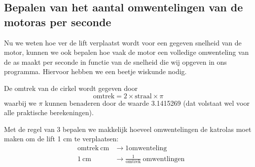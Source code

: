\documentclass[a4paper, 10pt]{article}
\begin{document}
\subsection{Bepalen van het aantal omwentelingen van de motoras per seconde}

Nu we weten hoe ver de lift verplaatst wordt voor een gegeven snelheid van de motor, kunnen we ook bepalen
hoe vaak de motor een volledige omwenteling van de as maakt per seconde in functie van de snelheid die wij
opgeven in ons programma. Hiervoor hebben we een beetje wiskunde nodig.

De omtrek van de cirkel wordt gegeven door
\begin{equation}
\mathrm{omtrek} = 2 \times \mathrm{straal} \times \pi
\end{equation}
waarbij we $\pi$ kunnen benaderen door de waarde 3.1415269 (dat volstaat wel voor alle praktische berekeningen).

Met de regel van 3 bepalen we makkelijk hoeveel omwentelingen de katrolas moet maken om de lift 1 cm te verplaatsen:
\begin{align}
& \mathrm{omtrek}\ \mathrm{cm} & \rightarrow 1 \mathrm{omwenteling}\\
& 1\ \mathrm{cm}               & \rightarrow \frac{1}{\mathrm{omtrek}}\ \mathrm{omwentlingen}
\end{align}
\end{document}

